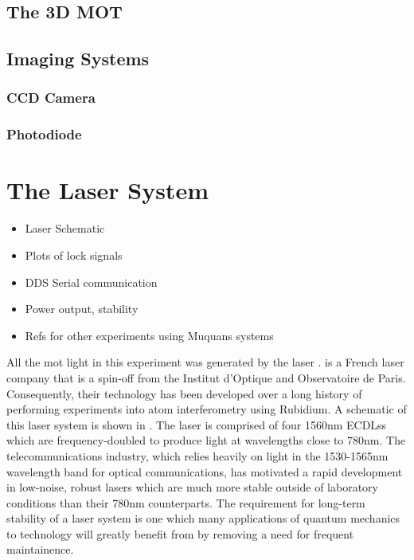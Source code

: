 \subsection{The 3D MOT}\label{subsec:setup_3DMOT}
\subsection{Imaging Systems}\label{subsec:setup_imaging}
\subsubsection{CCD Camera}\label{subsubsec:setup_ccd}
\subsubsection{Photodiode}\label{subsubsec:setup_photodiode}

\section{The \Muquans Laser System}\label{sec:setup_muquans}
\begin{itemize}
    \item Laser Schematic
    \item Plots of lock signals
    \item DDS Serial communication
    \item Power output, stability
    \item Refs for other experiments using Muquans systems
\end{itemize}
All the \ac{mot} light in this experiment was generated by the \Muquans laser \cite{muquansWebPage}. \Muquans is a French laser company that is a spin-off from the Institut d'Optique and Observatoire de Paris. Consequently, their technology has been developed over a long history of performing experiments into atom interferometry using Rubidium. A schematic of this laser system is shown in . The \Muquans laser is comprised of four 1560nm \acp{ECDLs} which are frequency-doubled to produce light at wavelengths close to 780nm. The telecommunications industry, which relies heavily on light in the 1530-1565nm wavelength band for optical communications, has motivated a rapid development in low-noise, robust lasers which are much more stable outside of laboratory conditions than their 780nm counterparts. The requirement for long-term stability of a laser system is one which many applications of quantum mechanics to technology will greatly benefit from by removing a need for frequent maintainence.

